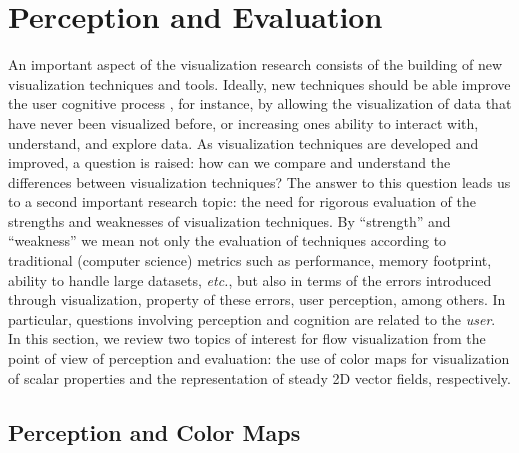 \section{Perception and Evaluation}
\label{sec:perceptionandevaluation}

An important aspect of the visualization research consists of the building of new visualization techniques and tools.
%
Ideally, new techniques should be able improve the user cognitive process \cite{Tory:2004:HFV:951847.951892}, for instance, by allowing the visualization of data that have never been visualized before, or increasing ones ability to interact with, understand, and explore data.
%
As visualization techniques are developed and improved, a question is raised: how can we compare and understand the differences between visualization techniques?
%
The answer to this question leads us to a second important research topic:
%
the need for rigorous evaluation of the strengths and weaknesses of visualization techniques.
%
By ``strength'' and ``weakness'' we mean not only the evaluation of techniques according to traditional (computer science) metrics such as performance, memory footprint, ability to handle large datasets, {\em etc.}, but also in terms of the errors introduced through visualization, property of these errors, user perception, among others.
% 
In particular, questions involving perception and cognition are related to the \emph{user}.
%
In this section, we review two topics of interest for flow visualization from the point of view of  perception and evaluation: the use of color maps for visualization of scalar properties and the representation of steady 2D vector fields, respectively.

\subsection{Perception and Color Maps}

%
%		
%	
%	
%	
%	

